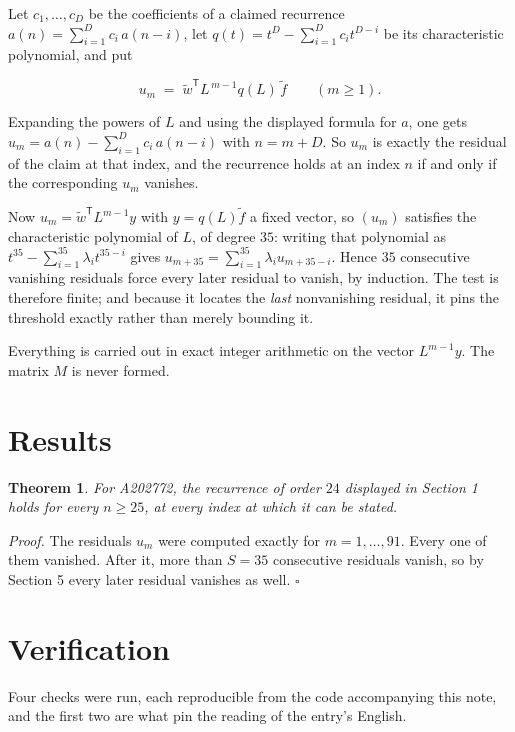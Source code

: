 \documentclass[11pt]{article}
\newtheorem{theorem}{Theorem}
\theoremstyle{definition}
\begin{document}
Let $c_1,\dots,c_D$ be the coefficients of a claimed recurrence $a(n) = \sum_{i=1}^{D} c_i\,a(n-i)$, let $q(t) = t^{D} - \sum_{i=1}^{D} c_i t^{D-i}$ be its characteristic polynomial, and put

\[u_m \;=\; \tilde w^{\mathsf T} L^{\,m-1} q(L)\,\tilde f \qquad (m \ge 1).\]

Expanding the powers of $L$ and using the displayed formula for $a$, one gets $u_m = a(n) - \sum_{i=1}^{D} c_i\,a(n-i)$ with $n = m + D$. So $u_m$ is exactly the residual of the claim at that index, and the recurrence holds at an index $n$ if and only if the corresponding $u_m$ vanishes.

Now $u_m = \tilde w^{\mathsf T} L^{m-1} y$ with $y = q(L)\tilde f$ a fixed vector, so $(u_m)$ satisfies the characteristic polynomial of $L$, of degree $35$: writing that polynomial as $t^{35} - \sum_{i=1}^{35} \lambda_i t^{35-i}$ gives $u_{m+35} = \sum_{i=1}^{35} \lambda_i u_{m+35-i}$. Hence $35$ consecutive vanishing residuals force every later residual to vanish, by induction. The test is therefore finite; and because it locates the {\itshape last} nonvanishing residual, it pins the threshold exactly rather than merely bounding it.

Everything is carried out in exact integer arithmetic on the vector $L^{m-1}y$. The matrix $M$ is never formed.

\section{Results}

\begin{theorem} For A202772, the recurrence of order $24$ displayed in Section 1 holds for every $n \ge 25$, at every index at which it can be stated.\end{theorem}

{\itshape Proof.} The residuals $u_m$ were computed exactly for $m = 1,\dots,91$. Every one of them vanished. After it, more than $S = 35$ consecutive residuals vanish, so by Section 5 every later residual vanishes as well. $\square$

\section{Verification}

Four checks were run, each reproducible from the code accompanying this note, and the first two are what pin the reading of the entry's English.
\end{document}
